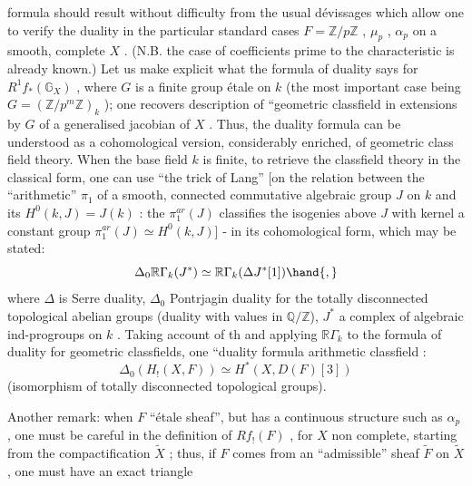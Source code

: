 
formula should result without difficulty from the usual dévissages which
allow one to verify the duality in the particular standard cases $F = \mathbb{Z}/p\mathbb{Z}$ ,
$\mu_p$ , $\alpha_p$ on a smooth, complete $X$ . (N.B. the case of coefficients prime
to the characteristic is already known.) Let us make explicit what the
formula of duality says for $R^1 f_*(\mathbb{G}_X)$ , where $G$ is a finite group étale
on $k$ (the most important case being $G = (\mathbb{Z}/p^m\mathbb{Z})_k$ ); one recovers  
description  of ``geometric classfield  in   extensions
by $G$ of a generalised jacobian of $X$ . Thus, the duality formula can be
understood as a cohomological version, considerably enriched, of geometric
class field theory. When the base field $k$ is finite, to retrieve the
classfield theory in the classical form, one can use ``the trick of Lang''
[on the relation between the ``arithmetic'' $\pi_1$ of a smooth, connected
commutative algebraic group $J$ on $k$ and its $H^0(k, J) = J(k)$ : the $\pi_1^{ar}(J)$
classifies the isogenies above $J$ with kernel a constant group
$\pi_1^{ar}(J) \simeq H^0(k, J)$] - in its cohomological form, which may be stated:
\[ \Delta_0 \mathbb{R}\Gamma_k(J^*) \simeq \mathbb{R}\Gamma_k(\Delta J^*[1]) \hand{,} \]
where $\Delta$ is Serre duality, $\Delta_0$ Pontrjagin duality for the totally disconnected
topological abelian groups (duality with values in $\mathbb{Q}/\mathbb{Z}$)\hand{)}, $J^*$ a complex of
algebraic ind-progroups on $k$ . Taking account of th  
and applying $\mathbb{R}\Gamma_k$ to the formula of duality for geometric classfields, one 
  ``duality formula  arithmetic classfield :
\[ \Delta_0(H_!(X, F)) \simeq H^*(X, D(F)[3]) \]
(isomorphism of totally disconnected topological groups).

Another remark: when $F$   ``étale sheaf'', but has a
continuous structure such as $\alpha_p$ , one must be careful in the definition of
$Rf_!(F)$ , for $X$ non complete, starting from the compactification $\tilde{X}$ ; thus,
if $F$ comes from an ``admissible'' sheaf $\tilde{F}$ on $\tilde{X}$ , one must have an exact
triangle

